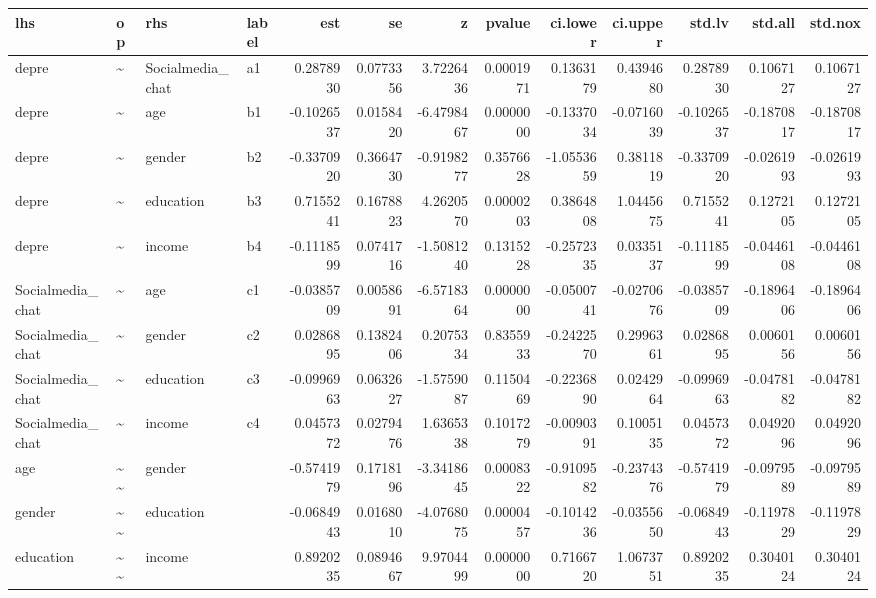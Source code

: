 \documentclass[
]{article}
\begin{document}
\begin{table}[!h]
\centering
\begin{tabular}[t]{llllrrrrrrrrr}
\toprule
lhs & op & rhs & label & est & se & z & pvalue & ci.lower & ci.upper & std.lv & std.all & std.nox\\
\midrule
depre & \textasciitilde{} & Socialmedia\_chat & a1 & 0.2878930 & 0.0773356 & 3.7226436 & 0.0001971 & 0.1363179 & 0.4394680 & 0.2878930 & 0.1067127 & 0.1067127\\
depre & \textasciitilde{} & age & b1 & -0.1026537 & 0.0158420 & -6.4798467 & 0.0000000 & -0.1337034 & -0.0716039 & -0.1026537 & -0.1870817 & -0.1870817\\
depre & \textasciitilde{} & gender & b2 & -0.3370920 & 0.3664730 & -0.9198277 & 0.3576628 & -1.0553659 & 0.3811819 & -0.3370920 & -0.0261993 & -0.0261993\\
depre & \textasciitilde{} & education & b3 & 0.7155241 & 0.1678823 & 4.2620570 & 0.0000203 & 0.3864808 & 1.0445675 & 0.7155241 & 0.1272105 & 0.1272105\\
depre & \textasciitilde{} & income & b4 & -0.1118599 & 0.0741716 & -1.5081240 & 0.1315228 & -0.2572335 & 0.0335137 & -0.1118599 & -0.0446108 & -0.0446108\\
\addlinespace
Socialmedia\_chat & \textasciitilde{} & age & c1 & -0.0385709 & 0.0058691 & -6.5718364 & 0.0000000 & -0.0500741 & -0.0270676 & -0.0385709 & -0.1896406 & -0.1896406\\
Socialmedia\_chat & \textasciitilde{} & gender & c2 & 0.0286895 & 0.1382406 & 0.2075334 & 0.8355933 & -0.2422570 & 0.2996361 & 0.0286895 & 0.0060156 & 0.0060156\\
Socialmedia\_chat & \textasciitilde{} & education & c3 & -0.0996963 & 0.0632627 & -1.5759087 & 0.1150469 & -0.2236890 & 0.0242964 & -0.0996963 & -0.0478182 & -0.0478182\\
Socialmedia\_chat & \textasciitilde{} & income & c4 & 0.0457372 & 0.0279476 & 1.6365338 & 0.1017279 & -0.0090391 & 0.1005135 & 0.0457372 & 0.0492096 & 0.0492096\\
age & \textasciitilde{}\textasciitilde{} & gender &  & -0.5741979 & 0.1718196 & -3.3418645 & 0.0008322 & -0.9109582 & -0.2374376 & -0.5741979 & -0.0979589 & -0.0979589\\
\addlinespace
gender & \textasciitilde{}\textasciitilde{} & education &  & -0.0684943 & 0.0168010 & -4.0768075 & 0.0000457 & -0.1014236 & -0.0355650 & -0.0684943 & -0.1197829 & -0.1197829\\
education & \textasciitilde{}\textasciitilde{} & income &  & 0.8920235 & 0.0894667 & 9.9704499 & 0.0000000 & 0.7166720 & 1.0673751 & 0.8920235 & 0.3040124 & 0.3040124\\

\end{tabular}
\end{table}
\end{document}
